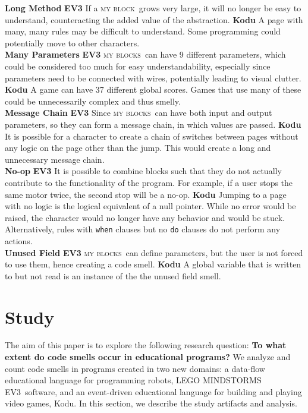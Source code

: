 \documentclass[conference]{IEEEtran}
\newcommand{\ms}{LEGO MINDSTORMS EV3}
\newcommand{\mbs}{\textsc{my blocks}}
\newcommand{\mb}{\textsc{my block}}
\begin{document}
\textbf{Long Method} \textbf{EV3} If a \mb~grows very large, it will no longer be easy to understand, counteracting the added value of the abstraction. \textbf{Kodu} A page with many, many rules may be difficult to understand. Some programming could potentially move to other characters.\\
\textbf{Many Parameters} \textbf{EV3} \mbs~can have 9 different parameters, which could be considered too much for easy understandability, especially since parameters need to be connected with wires, potentially leading to visual clutter. \textbf{Kodu} A game can have 37 different global scores. Games that use many of these could be unnecessarily complex and thus smelly.\\
\textbf{Message Chain} \textbf{EV3} Since \mbs~can have both input and output parameters, so they can form a message chain, in which values are passed. \textbf{Kodu} It is possible for a character to create a chain of switches between pages without any logic on the page other than the jump. This would create a long and unnecessary message chain.\\
\textbf{No-op} \textbf{EV3} It is possible to combine blocks such that they do not actually contribute to the functionality of the program. For example, if a user stops the same motor twice, the second stop will be a no-op. \textbf{Kodu} Jumping to a page with no logic is the logical equivalent of a null pointer. While no error would be raised, the character would no longer have any behavior and would be stuck. Alternatively, rules with {\tt when} clauses but no {\tt do} clauses do not perform any actions.\\
\textbf{Unused Field} \textbf{EV3} \mbs~can define parameters, but the user is not forced to use them, hence creating a code smell.  \textbf{Kodu} A global variable that is written to but not read is an instance of the the unused field smell.\\


\section{Study}
\label{sec:study}
The aim of this paper is to explore the following research question: \textbf{To what extent do code smells occur in educational programs?} 
We analyze and count code smells in programs created in two new domains: a data-flow educational language for programming robots, \ms~software, and an event-driven educational language for building and playing video games, Kodu. 
In this section, we describe the study artifacts and analysis. 
\end{document}
